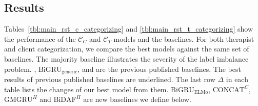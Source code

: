 \subsection{Results}




Tables~\ref{tbl:main_rst_c_categorizing} and
\ref{tbl:main_rst_t_categorizing} show the performance of the
$\mathcal{C}_C$ and $\mathcal{C}_T$ models and the baselines.
%
For both therapist and client categorization, we compare the best
models against the same set of baselines. The majority baseline
illustrates the severity of the label imbalance
problem. \citet{xiao2016behavioral}, $\text{BiGRU}_{\text{generic}}$,
\citet{can2015dialog} and \citet{tanana2016comparison} are the
previous published baselines. The best results of previous published
baselines are underlined. The last row
$\Delta$ in each table lists the changes of our best model from
them. $\text{BiGRU}_{\text{ELMo}}$, $\text{CONCAT}^{C}$,
$\text{GMGRU}^{H}$ and $\text{BiDAF}^{H}$ are new baselines
we define below.


